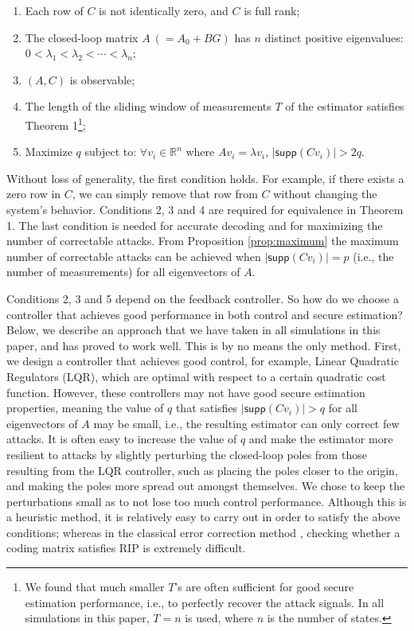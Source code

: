 \documentclass[../../thesis.tex]{subfiles}
\begin{document}
\begin{enumerate}
	\item Each row of $C$ is not identically zero, and $C$ is full rank;
	\item The closed-loop matrix $A~(=A_0+BG)$ has $n$ distinct positive eigenvalues: $0< \lambda_1 < \lambda_2 < \cdots < \lambda _n$;
	\item $(A,C)$ is observable;
	\item The length of the sliding window of measurements $T$ of the estimator satisfies Theorem 1\footnote{We found that much smaller $T$'s are often sufficient for good secure estimation performance, i.e., to perfectly recover the attack signals. In all simulations in this paper, $T=n$ is used, where $n$ is the number of states.};
	\item Maximize $q$ subject to: $\forall v_i \in \mathbb{R}^n$ where $Av_i = \lambda v_i$, $\lvert \textsf{supp} (C v_i)  \rvert > 2q$.
\end{enumerate}
Without loss of generality, the first condition holds. For example, if there exists a zero row in $C$, we can simply remove that row from $C$ without changing the system's behavior. Conditions 2, 3 and 4 are required for equivalence in Theorem 1. The last condition is needed for accurate decoding and for maximizing the number of correctable attacks. From Proposition \ref{prop:maximum} the maximum number of correctable attacks can be achieved when $\lvert \textsf{supp} (C v_i)  \rvert = p$ (i.e., the number of measurements) for all eigenvectors of $A$. 

Conditions 2, 3 and 5 depend on the feedback controller. So how do we choose a controller that achieves good performance in both control and secure estimation? Below, we describe an approach that we have taken in all simulations in this paper, and has proved to work well. This is by no means the only method. First, we design a controller that achieves good control, for example, Linear Quadratic Regulators (LQR), which are optimal with respect to a certain quadratic cost function. However, these controllers may not have good secure estimation properties, meaning the value of $q$ that satisfies $\lvert \textsf{supp} (C v_i) \rvert > q$ for all eigenvectors of $A$ may be small, i.e., the resulting estimator can only correct few attacks. It is often easy to increase the value of $q$ and make the estimator more resilient to attacks by slightly perturbing the closed-loop poles from those resulting from the LQR controller, such as placing the poles closer to the origin, and making the poles more spread out amongst themselves. We chose to keep the perturbations small as to not lose too much control performance.  
Although this is a heuristic method, it is relatively easy to carry out in order to satisfy the above conditions; whereas in the classical error correction method \cite{tao11}, checking whether a coding matrix satisfies RIP is extremely difficult.
\end{document}
